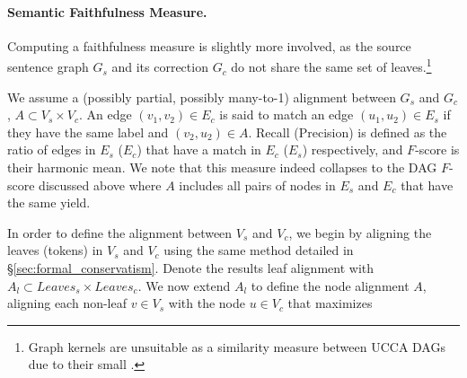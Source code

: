 \documentclass[letter,11pt]{article}
\begin{document}
\paragraph{Semantic Faithfulness Measure.} Computing a faithfulness
measure is slightly more involved, as the source sentence graph $G_s$ and its
correction $G_c$ do not share the same set of leaves.\footnote{Graph kernels are unsuitable
  as a similarity measure between UCCA 
  DAGs due to their small \cite{kashima2003marginalized}.} 

%
%
We assume a (possibly partial, possibly many-to-1) alignment between $G_s$ and $G_c$,
$A \subset V_s \times V_c$. An edge $(v_1,v_2) \in E_c$ is said to match an edge
$(u_1,u_2) \in E_s$ if they have the same label and $(v_2,u_2) \in A$. Recall (Precision)
is defined as the ratio of edges in $E_s$ ($E_c$) that have a match in $E_c$ ($E_s$) respectively, and
$F$-score is their harmonic mean. We note that this measure indeed collapses to the
DAG $F$-score discussed above where $A$ includes all pairs of nodes in $E_s$ and $E_c$ that have
the same yield.

In order to define the alignment between $V_s$ and $V_c$, we begin by aligning the leaves
(tokens) in $V_s$ and $V_c$ using the same method detailed in \S \ref{sec:formal_conservatism}.
Denote the results leaf alignment with $A_l \subset Leaves_s \times Leaves_c$.
We now extend $A_l$ to define the node alignment $A$, aligning each non-leaf $v \in V_s$
with the node $u \in V_c$ that maximizes
\end{document}
